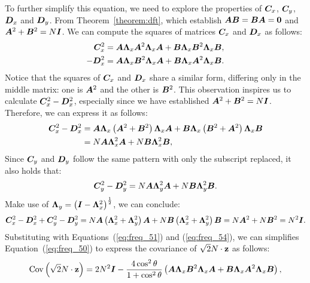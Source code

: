 To further simplify this equation, we need to explore the properties of ${\bm{C}}_x$, ${\bm{C}}_y$, ${\bm{D}}_x$ and ${\bm{D}}_y$. 
From Theorem~\ref{theorem:dft}, which establish ${\bm{A}}{\bm{B}}={\bm{B}}{\bm{A}}=\mathbf{0}$ and ${\bm{A}}^2+{\bm{B}}^2=N{\bm{I}}$. We can compute the squares of matrices ${\bm{C}}_x$ and ${\bm{D}}_x$ as follows:
\begin{equation}
\label{eq:freq_51}
\begin{split}
    {\bm{C}}_x^2 & = {\bm{A}}{\bm{\Lambda}}_x{\bm{A}}^2{\bm{\Lambda}}_x{\bm{A}} + {\bm{B}}{\bm{\Lambda}}_x{\bm{B}}^2{\bm{\Lambda}}_x{\bm{B}}, \\
    -{\bm{D}}_x^2 & = {\bm{A}}{\bm{\Lambda}}_x{\bm{B}}^2{\bm{\Lambda}}_x{\bm{A}} + {\bm{B}}{\bm{\Lambda}}_x{\bm{A}}^2{\bm{\Lambda}}_x{\bm{B}}.
\end{split}
\end{equation}
Notice that the squares of ${\bm{C}}_x$ and ${\bm{D}}_x$ share a similar form, differing only in the middle matrix: one is ${\bm{A}}^2$ and the other is ${\bm{B}}^2$. This observation inspires us to calculate ${\bm{C}}_x^2-{\bm{D}}_x^2$, especially since we have established ${\bm{A}}^2+{\bm{B}}^2=N{\bm{I}}$. Therefore, we can express it as follows:
\begin{equation}
\begin{split}
    {\bm{C}}_x^2-{\bm{D}}_x^2&= {\bm{A}}{\bm{\Lambda}}_x\left({\bm{A}}^2+{\bm{B}}^2\right){\bm{\Lambda}}_x{\bm{A}} + {\bm{B}}{\bm{\Lambda}}_x\left({\bm{B}}^2+{\bm{A}}^2\right){\bm{\Lambda}}_x{\bm{B}}\\ 
    & = N {\bm{A}}{\bm{\Lambda}}_x^2{\bm{A}} + N{\bm{B}}{\bm{\Lambda}}_x^2{\bm{B}}, \\
\end{split}
\end{equation}
Since ${\bm{C}}_y$ and ${\bm{D}}_y$ follow the same pattern with only the subscript replaced, it also holds that:
\begin{equation}
    {\bm{C}}_y^2-{\bm{D}}_y^2 = N {\bm{A}}{\bm{\Lambda}}_y^2{\bm{A}} + N{\bm{B}}{\bm{\Lambda}}_y^2{\bm{B}}. 
\end{equation}
Make use of ${\bm{\Lambda}}_y=\left({\bm{I}}-{\bm{\Lambda}}_x^2\right)^{\frac{1}{2}}$, we can conclude:
\begin{equation}
\label{eq:freq_54}
    {\bm{C}}_x^2-{\bm{D}}_x^2 + {\bm{C}}_y^2-{\bm{D}}_y^2 = N {\bm{A}}\left({\bm{\Lambda}}_x^2+{\bm{\Lambda}}_y^2\right){\bm{A}} + N{\bm{B}}\left({\bm{\Lambda}}_x^2+{\bm{\Lambda}}_y^2\right){\bm{B}} =N{\bm{A}}^2+N{\bm{B}}^2=N^2{\bm{I}}.
\end{equation}
Substituting with Equations~(\ref{eq:freq_51}) and (\ref{eq:freq_54}), we can simplifies Equation~(\ref{eq:freq_50}) to express the covariance of $\sqrt{2}N\cdot\mathbf{z}$ as follows:
\begin{equation}
\label{eq:freq_55}
    \mathrm{Cov}\left(\sqrt{2}N\cdot\mathbf{z}\right) = 
    2N^2{\bm{I}}
    -\frac{4\cos^2\theta}{1+\cos^2\theta}
    \left( {\bm{A}}{\bm{\Lambda}}_x{\bm{B}}^2{\bm{\Lambda}}_x{\bm{A}} + {\bm{B}}{\bm{\Lambda}}_x{\bm{A}}^2{\bm{\Lambda}}_x{\bm{B}}
    \right),
\end{equation}
